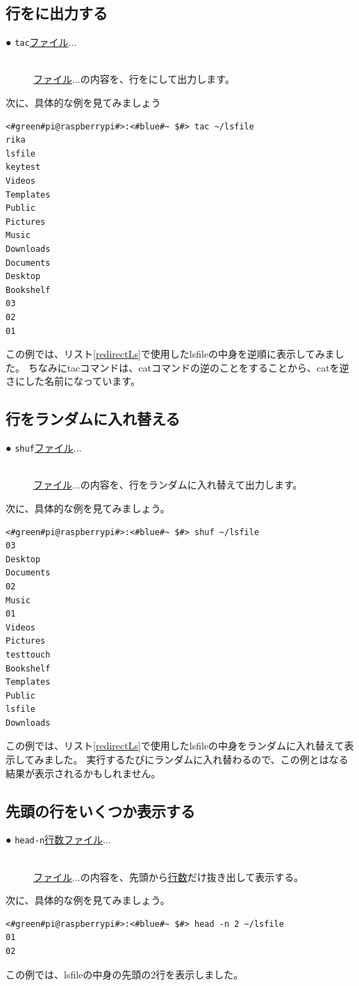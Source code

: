 \documentclass[text03.tex]{subfiles}
\begin{document}
\subsection{行をに出力する}
\begin{description}
    \item[● \texttt{tac}\textvisiblespace \underline{ファイル}$\ldots$]\mbox{}\\
    \underline{ファイル}$\ldots$の内容を、行をにして出力します。
\end{description}
次に、具体的な例を見てみましょう
\begin{lstlisting}[caption=tacコマンドの実行例, label=tac_example]
<#green#pi@raspberrypi#>:<#blue#~ $#> tac ~/lsfile
rika
lsfile
keytest
Videos
Templates
Public
Pictures
Music
Downloads
Documents
Desktop
Bookshelf
03
02
01
\end{lstlisting}
この例では、リスト\ref{redirectLs}で使用したlsfileの中身を逆順に表示してみました。
ちなみにtacコマンドは、catコマンドの逆のことをすることから、catを逆さにした名前になっています。


\subsection{行をランダムに入れ替える}
\begin{description}
    \item[● \texttt{shuf}\textvisiblespace \underline{ファイル}$\ldots$]\mbox{}\\
    \underline{ファイル}$\ldots$の内容を、行をランダムに入れ替えて出力します。
\end{description}
次に、具体的な例を見てみましょう。
\begin{lstlisting}[caption=shufコマンドの実行例, label=shuf_example]
<#green#pi@raspberrypi#>:<#blue#~ $#> shuf ~/lsfile
03
Desktop
Documents
02
Music
01
Videos
Pictures
testtouch
Bookshelf
Templates
Public
lsfile
Downloads
\end{lstlisting}
この例では、リスト\ref{redirectLs}で使用したlsfileの中身をランダムに入れ替えて表示してみました。
実行するたびにランダムに入れ替わるので、この例とはなる結果が表示されるかもしれません。

\subsection{先頭の行をいくつか表示する}
\begin{description}
    \item[● \texttt{head}\textvisiblespace \texttt{-n}\textvisiblespace \underline{行数}\textvisiblespace \underline{ファイル}$\ldots$ ]\mbox{}\\
    \underline{ファイル}$\ldots$の内容を、先頭から\underline{行数}だけ抜き出して表示する。
\end{description}
次に、具体的な例を見てみましょう。
\begin{lstlisting}[caption=headコマンドの実行例, label=shuf_example]
<#green#pi@raspberrypi#>:<#blue#~ $#> head -n 2 ~/lsfile
01
02
\end{lstlisting}
この例では、lsfileの中身の先頭の2行を表示しました。
\end{document}
